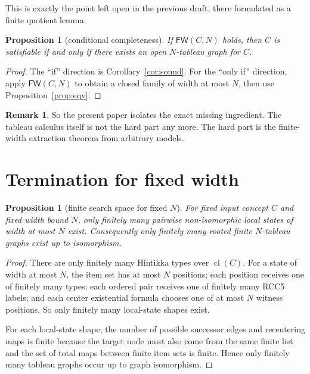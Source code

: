 \documentclass[11pt]{article}
\newtheorem{proposition}[theorem]{Proposition}
\theoremstyle{definition}
\newtheorem{remark}[theorem]{Remark}
\newcommand{\cl}{\operatorname{cl}}
\begin{document}
This is exactly the point left open in the previous draft, there formulated as a finite quotient lemma.

\begin{proposition}[conditional completeness]\label{prop:condcomplete}
If $\mathsf{FW}(C,N)$ holds, then $C$ is satisfiable if and only if there exists an open $N$-tableau graph for $C$.
\end{proposition}

\begin{proof}
The ``if'' direction is Corollary~\ref{cor:sound}. For the ``only if'' direction, apply $\mathsf{FW}(C,N)$ to obtain a closed family of width at most $N$, then use Proposition~\ref{prop:eqv}.
\end{proof}

\begin{remark}
So the present paper isolates the exact missing ingredient. The tableau calculus itself is not the hard part any more. The hard part is the finite-width extraction theorem from arbitrary models.
\end{remark}

\section{Termination for fixed width}

\begin{proposition}[finite search space for fixed $N$]\label{prop:finite}
For fixed input concept $C$ and fixed width bound $N$, only finitely many pairwise non-isomorphic local states of width at most $N$ exist. Consequently only finitely many rooted finite $N$-tableau graphs exist up to isomorphism.
\end{proposition}

\begin{proof}
There are only finitely many Hintikka types over $\cl(C)$. For a state of width at most $N$, the item set has at most $N$ positions; each position receives one of finitely many types; each ordered pair receives one of finitely many RCC5 labels; and each center existential formula chooses one of at most $N$ witness positions. So only finitely many local-state shapes exist.

For each local-state shape, the number of possible successor edges and recentering maps is finite because the target node must also come from the same finite list and the set of total maps between finite item sets is finite. Hence only finitely many tableau graphs occur up to graph isomorphism.
\end{proof}
\end{document}
